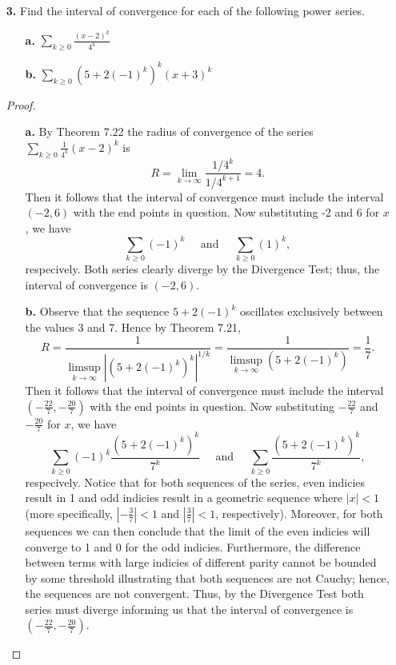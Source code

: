 \documentclass[ 12pt ]{article}
\begin{document}
\begin{enumerate}
	\item[\textbf{3.}] Find the interval of convergence for each of the following power series.
		\begin{enumerate}
			\item[\textbf{a.}] $\sum_{k \geq 0} \frac{(x-2)^k}{4^k}$
			\item[\textbf{b.}] $\sum_{k \geq 0} (5 + 2(-1)^k)^k (x + 3)^k$
		\end{enumerate}

		\begin{proof}
			\begin{enumerate}
				\item[\textbf{a.}] By Theorem 7.22 the radius of convergence of the series $\sum_{k \geq 0} \frac{1}{4^k}(x-2)^k$ is $$R = \lim_{k \to \infty} \frac{1/4^k}{1/4^{k+1}}
					= 4.$$ Then it follows that the interval of convergence must include the interval $(-2, 6)$ with the end points in question. Now substituting -2 and 6 for $x$, we
					have $$\sum_{k \geq 0} (-1)^k\;\;\;\;\; \mathrm{and}\;\;\;\;\; \sum_{k \geq 0} (1)^k,$$ respecively. Both series clearly diverge by the Divergence Test; thus, the
					interval of convergence is $(-2, 6)$.

				\item[\textbf{b.}] Observe that the sequence $5 + 2(-1)^k$ oscillates exclusively between the values 3 and 7. Hence by Theorem 7.21, $$R = \frac{1}{\limsup_{k \to
					\infty} |(5 + 2(-1)^k)^k|^{1/k}} = \frac{1}{\limsup_{k \to \infty} (5 + 2(-1)^k)} = \frac{1}{7}.$$ Then it follows that the interval of convergence must include the
					interval $\left (-\frac{22}{7}, -\frac{20}{7} \right )$ with the end points in question. Now substituting $-\frac{22}{7}$ and $-\frac{20}{7}$ for $x$, we have
					$$\sum_{k \geq 0} (-1)^k \frac{(5 + 2(-1)^k)^k}{7^k}\;\;\;\;\; \mathrm{and}\;\;\;\;\; \sum_{k \geq 0} \frac{(5 + 2(-1)^k)^k}{7^k},$$ respecively. Notice that for
					both sequences of the series, even indicies result in 1 and odd indicies result in a geometric sequence where $|x| < 1$ (more specifically, $\left | -\frac{3}{7}
					\right | < 1$ and $\left | \frac{3}{7} \right | < 1$, respectively). Moreover, for both sequences we can then conclude that the limit of the even indicies will
					converge to 1 and 0 for the odd indicies. Furthermore, the difference between terms with large indicies of different parity cannot be bounded by some threshold
					illustrating that both sequences are not Cauchy; hence, the sequences are not convergent. Thus, by the Divergence Test both series must diverge informing us that
					the interval of convergence is $\left (-\frac{22}{7}, -\frac{20}{7} \right )$.
			\end{enumerate}
		\end{proof}



\end{enumerate}
\end{document}
